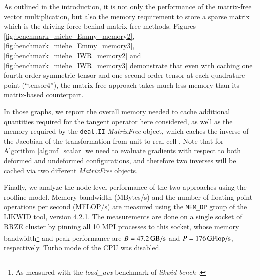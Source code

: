 \documentclass[times,doublespace]{nmeauth}
\newcommand{\changeDD}[1]{#1}
\newcommand{\changeJP}[1]{#1}
\begin{document}
As outlined in the introduction, it is not only the performance of the matrix-free vector multiplication, but also the memory requirement to store a sparse matrix which is the driving force behind matrix-free methods.
Figures \ref{fig:benchmark_miehe_Emmy_memory2}, \ref{fig:benchmark_miehe_Emmy_memory3}, \ref{fig:benchmark_miehe_IWR_memory2} and \ref{fig:benchmark_miehe_IWR_memory3} demonstrate that even with caching one fourth-order symmetric tensor and one second-order tensor at each quadrature point \changeJP{(``tensor4'')}, the matrix-free approach takes much less memory than its matrix-based counterpart.
\changeDD{
In those graphs, we report the \changeJP{overall} memory needed to cache additional quantities required for the tangent operator here considered,
as well as the memory required by the \texttt{deal.II} \textit{MatrixFree} object, which caches the inverse of the Jacobian of the transformation
from unit to real cell \cite{kronbichler12}.
Note that for Algorithm \ref{alg:mf_scalar} we need to evaluate gradients with respect to both \changeJP{deformed} and undeformed
configurations, and therefore two inverses will be cached via two different \textit{MatrixFree} objects.}

\changeDD{
Finally, we analyze the node-level performance of the two approaches using the roofline model.
Memory bandwidth (MBytes/s) and the number of floating point operations per second (MFLOP/s) are measured using the \texttt{MEM\_DP} group of the LIKWID \cite{likwid} tool, version 4.2.1.
The measurements are done on a single socket of RRZE cluster by pinning all 10 MPI processes to this socket, whose
memory bandwidth\footnote{As measured with the \textit{load\_avx} benchmark of \textit{likwid-bench} \cite{likwid}.} and peak performance are $B=47.2 \,\rm{GB/s}$ and $P=176\, \rm{GFlop/s}$, respectively.
Turbo mode of the CPU was disabled.
}
\end{document}
